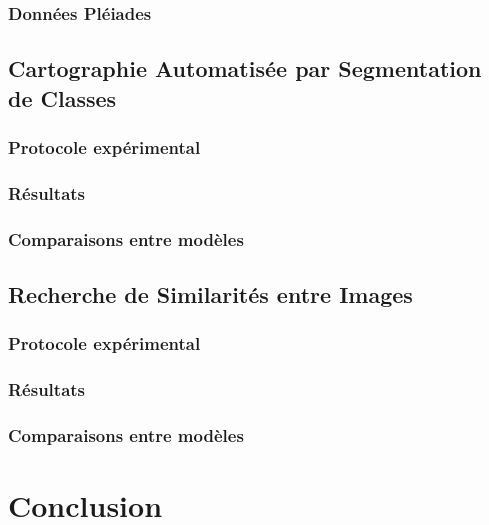 \documentclass[a4paper, 10pt]{report}
\begin{document}
\subsection{Données Pléiades}
\section{Cartographie Automatisée par Segmentation de Classes}
\subsection{Protocole expérimental}
\subsection{Résultats}
\subsection{Comparaisons entre modèles}
\section{Recherche de Similarités entre Images}
\subsection{Protocole expérimental}
\subsection{Résultats}
\subsection{Comparaisons entre modèles}
\chapter{Conclusion}
\end{document}
